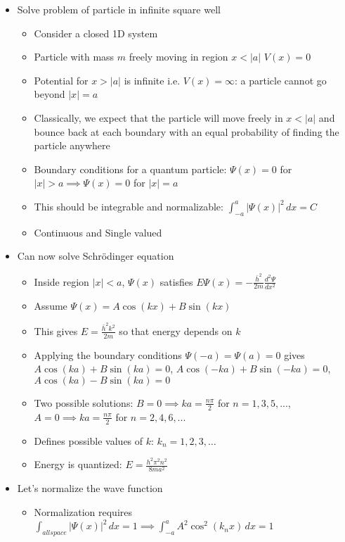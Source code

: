 \documentclass[12pt]{article}
\begin{document}
\begin{itemize}
    \item Solve problem of particle in infinite square well \begin{itemize}
        \item Consider a closed 1D system
        \item Particle with mass $m$ freely moving in region $x < |a|$ $V(x) = 0$
        \item Potential for $x > |a|$ is infinite i.e. $V(x) = \infty$: a particle cannot go beyond $|x| = a$
        \item Classically, we expect that the particle will move freely in $x < |a|$ and bounce back at each boundary with an equal probability of finding the particle anywhere
        \item Boundary conditions for a quantum particle: $\varPsi(x) = 0$ for $|x| > a \implies \varPsi(x) = 0$ for $|x| = a$
        \item This should be integrable and normalizable: $\int_{-a}^{a} | \varPsi(x) |^2 \, dx = C$
        \item Continuous and Single valued
    \end{itemize}
    \item Can now solve Schr\"{o}dinger equation \begin{itemize}
        \item Inside region $|x| < a$, $\varPsi(x)$ satisfies $E \varPsi(x) = - \frac{\bar{h}^2}{2m} \frac{d^2 \varPsi}{dx^2}$
        \item Assume $\varPsi(x) = A \cos(kx) + B \sin(kx)$
        \item This gives $E = \frac{\bar{h}^2k^2}{2m}$ so that energy depends on $k$
        \item Applying the boundary conditions $\varPsi(-a) = \varPsi(a) = 0$ gives $A \cos(ka) + B \sin(ka) = 0$, $A \cos(-ka) + B \sin(-ka) = 0$, $A \cos(ka) - B \sin(ka) = 0$
        \item Two possible solutions: $B = 0 \implies ka = \frac{n \pi}{2}$ for $n = 1, 3, 5, ...$, $A = 0 \implies ka = \frac{n \pi}{2}$ for $n = 2, 4, 6, ...$
        \item Defines possible values of $k$: $k_n = 1, 2, 3, \dots$
        \item Energy is quantized: $E = \frac{h^2 \pi^2 n^2}{8ma^2}$
    \end{itemize}
    \item Let's normalize the wave function \begin{itemize}
        \item Normalization requires $\int_{all space} | \varPsi(x) |^2 \, dx = 1 \implies \int_{-a}^{a} A^2 \cos^2 (k_n x) \, dx = 1$ 

\end{itemize}
\end{itemize}
\end{document}
